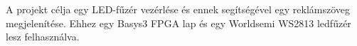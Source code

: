 \tab A projekt célja egy LED-fűzér vezérlése és ennek segítségével egy reklámszöveg megjelenítése.
Ehhez egy Basys3 FPGA lap és egy Worldsemi WS2813 ledfűzér lesz felhasználva.